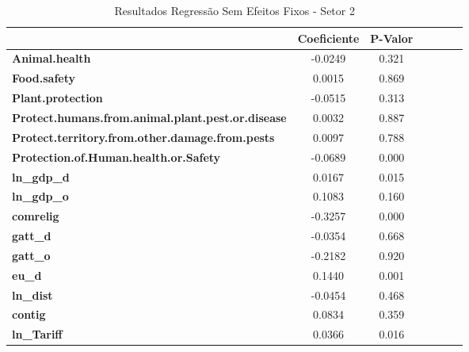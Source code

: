 \begin{table}[ht!]
    \begin{center}
        \begin{tabular}{lcccccc}
            & \textbf{Coeficiente} & \textbf{P-Valor}\\
            \midrule
\textbf{Animal.health}                                    &      -0.0249  &  0.321 \\
\textbf{Food.safety}                                      &       0.0015  &  0.869 \\
\textbf{Plant.protection}                                 &      -0.0515  &  0.313 \\
\textbf{Protect.humans.from.animal.plant.pest.or.disease} &       0.0032  &  0.887 \\
\textbf{Protect.territory.from.other.damage.from.pests}   &       0.0097  &  0.788 \\
\textbf{Protection.of.Human.health.or.Safety}             &      -0.0689  &  0.000 \\
\textbf{ln\_gdp\_d}                                       &       0.0167  &  0.015 \\
\textbf{ln\_gdp\_o}                                       &       0.1083  &  0.160 \\
\textbf{comrelig}                                         &      -0.3257  &  0.000 \\
\textbf{gatt\_d}                                          &      -0.0354  &  0.668 \\
\textbf{gatt\_o}                                          &      -0.2182  &  0.920 \\
\textbf{eu\_d}                                            &       0.1440  &  0.001 \\
\textbf{ln\_dist}                                         &      -0.0454  &  0.468 \\
\textbf{contig}                                           &       0.0834  &  0.359 \\
\textbf{ln\_Tariff}                                       &       0.0366  &  0.016 \\
\bottomrule
\end{tabular}
\caption{Resultados Regressão Sem Efeitos Fixos - Setor 2}
\end{center}
\end{table}